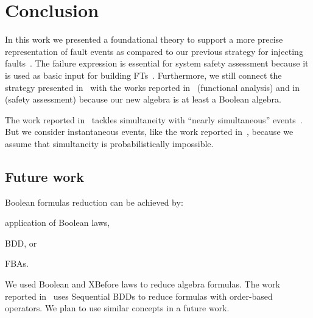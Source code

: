 \documentclass[12pt,openright,twoside,a4paper,oldfontcommands,english,brazil,final]{abntex2}
\theoremstyle{theo}
\newcommand{\simulink}{Simulink\xspace}
\newcommand{\distinctlist}{%
  distinct list\footnote{Although some may use the terminology ``disjoint list'' to call a list of non-repeated elements, we use the same terminology (distinct list) of the theories built-in the \isabellehol tool.}%
  \global\renewcommand{\distinctlist}{distinct list}%
  \global\renewcommand{\distinctlists}{distinct lists}%
}
\newcommand{\distinctlists}{%
  distinct lists\footnote{Although some may use the terminology ``disjoint lists'' to call the lists of non-repeated elements, we use the same terminology (distinct lists) of the theories built-in the \isabellehol tool.}%
  \global\renewcommand{\distinctlist}{distinct list\xspace}%
  \global\renewcommand{\distinctlists}{distinct lists\xspace}%
  \xspace%
}
\newcommand{\isabellehol}[1][]{%
  Isabelle/HOL{#1}\index{Isabelle/HOL}~2015\footnote{The 2002 tutorial is reported in~\cite{NPW2002}, but there is a newer version published with the tool itself.
  The tool and the tutorial are available on their website at \url{http://isabelle.in.tum.de}.}%
  \global\renewcommand{\isabellehol}[1][]{Isabelle/HOL{#1}\index{Isabelle/HOL}\xspace}\xspace %
}
\begin{document}
\chapter{Conclusion}
\label{sec:conclusion}

In this work we presented a foundational theory to support a more precise representation of fault events as compared to our previous strategy for injecting faults~\cite{DM2012}.
%
The failure expression is essential for system safety assessment because it is used as basic input for building \aclp{FT}~\cite{PMS+2001,JMS+2011,GMS+2010}.
%
%
Furthermore, we still connect the strategy presented in~\cite{MJG+2010} with the works reported in~\cite{JMS+2011} (functional analysis) and in~\cite{GMS+2010,PMS+2001} (safety assessment) because our new algebra is at least a Boolean algebra.

\begin{sloppypar}
The work reported in~\cite{Walker2009,WP2009,WP2010} tackles simultaneity with ``nearly simultaneous'' events~\cite{EWG2013}.
But we consider instantaneous events, like the work reported in~\cite{MRL2014}, because we assume that simultaneity is probabilistically impossible.
\end{sloppypar}

\section{Future work}


Boolean formulas reduction can be achieved by:
\begin{alineasinline}
  \item application of Boolean laws,
  \item \ac{BDD}, or
  \item \acp{FBA}.
\end{alineasinline}
We used Boolean and \ac{XBefore} laws to reduce \ac{algebra} formulas.
%
The work reported in~\cite{TXD2011,XTD2012} uses Sequential BDDs to reduce formulas with order-based operators.
%
We plan to use similar concepts in a future work.
\end{document}
